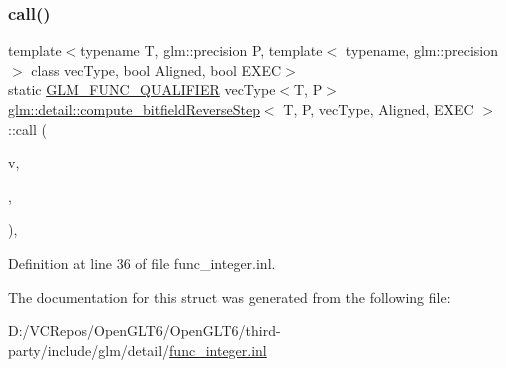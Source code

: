 \subsubsection{\texorpdfstring{call()}{call()}}
{\footnotesize\ttfamily template$<$typename T, glm\+::precision P, template$<$ typename, glm\+::precision $>$ class vec\+Type, bool Aligned, bool E\+X\+EC$>$ \\
static \mbox{\hyperlink{setup_8hpp_a33fdea6f91c5f834105f7415e2a64407}{G\+L\+M\+\_\+\+F\+U\+N\+C\+\_\+\+Q\+U\+A\+L\+I\+F\+I\+ER}} vec\+Type$<$T, P$>$ \mbox{\hyperlink{structglm_1_1detail_1_1compute__bitfield_reverse_step}{glm\+::detail\+::compute\+\_\+bitfield\+Reverse\+Step}}$<$ T, P, vec\+Type, Aligned, E\+X\+EC $>$\+::call (\begin{DoxyParamCaption}\item[{vec\+Type$<$ T, P $>$ const \&}]{v,  }\item[{T}]{,  }\item[{T}]{ }\end{DoxyParamCaption})\hspace{0.3cm}{\ttfamily [inline]}, {\ttfamily [static]}}



Definition at line 36 of file func\+\_\+integer.\+inl.



The documentation for this struct was generated from the following file\+:\begin{DoxyCompactItemize}
\item 
D\+:/\+V\+C\+Repos/\+Open\+G\+L\+T6/\+Open\+G\+L\+T6/third-\/party/include/glm/detail/\mbox{\hyperlink{func__integer_8inl}{func\+\_\+integer.\+inl}}\end{DoxyCompactItemize}
